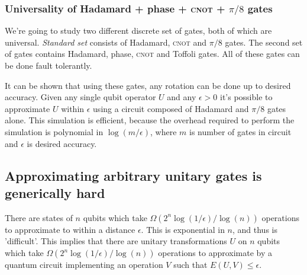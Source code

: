 \subsubsection{Universality of Hadamard + phase + \textsc{cnot} + $\pi/8$ gates}
We're going to study two different discrete set of gates, both of which are universal. \textit{Standard set} consists of Hadamard, \textsc{cnot} and $\pi/8$ gates. The second set of gates contains Hadamard, phase, \textsc{cnot} and Toffoli gates. All of these gates can be done fault tolerantly. 

It can be shown that using these gates, any rotation can be done up to desired accuracy. Given any single qubit operator $U$ and any $\epsilon>0$ it's possible to approximate $U$ within $\epsilon$ using a circuit composed of Hadamard and $\pi/8$ gates alone. This simulation is efficient, because the overhead required to perform the simulation is polynomial in $\log(m/\epsilon)$, where $m$ is number of gates in circuit and $\epsilon$ is desired accuracy.

\subsection{Approximating arbitrary unitary gates is generically hard}
There are states of $n$ qubits which take $\Omega(2^n\log(1/\epsilon)/\log(n))$ operations to approximate to within a distance $\epsilon$. This is exponential in $n$, and thus is 'difficult'. This implies that there are unitary transformations $U$ on $n$ qubits which take $\Omega(2^n\log(1/\epsilon)/\log(n))$ operations to approximate by a quantum circuit implementing an operation $V$ such that $E(U,V) \leq \epsilon$.

